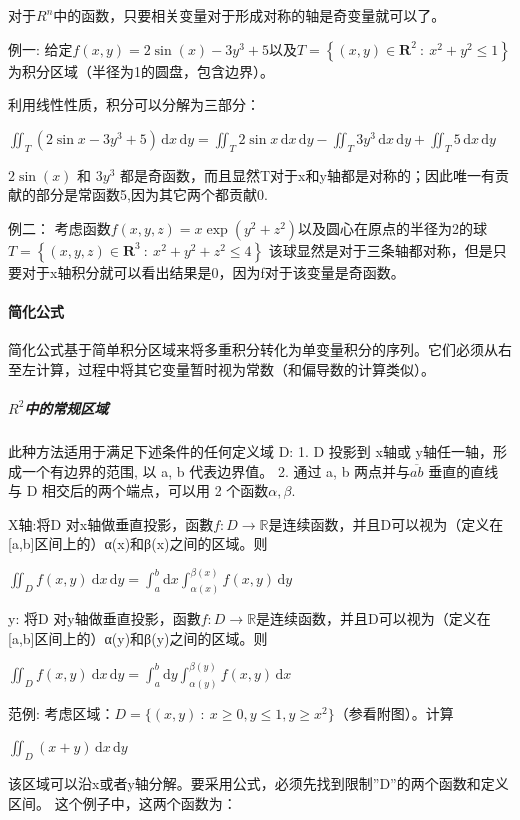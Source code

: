 \documentclass[UTF-8]{ctexart}
\begin{document}
对于$R^n$中的函数，只要相关变量对于形成对称的轴是奇变量就可以了。

例一:
给定$f(x,y) = 2 \sin(x)-3y^3+5$以及$T=\left \{ ( x,y) \in \mathbf{R}^2 \ : \ x^2+y^2\le 1 \right \}$为积分区域（半径为1的圆盘，包含边界）。

利用线性性质，积分可以分解为三部分：

$\iint_T (2\sin x - 3y^3 + 5) \, \mathrm{d}x \, \mathrm{d}y = \iint_T 2 \sin x \, \mathrm{d}x \, \mathrm{d}y - \iint_T 3y^3 \, \mathrm{d}x \, \mathrm{d}y + \iint_T 5 \, \mathrm{d}x \, \mathrm{d}y$

$2\sin(x)$ 和 $3y^3$ 都是奇函数，而且显然T对于x和y轴都是对称的；因此唯一有贡献的部分是常函数5,因为其它两个都贡献0.

例二：
考虑函数$f(x,y,z)=x \exp(y^2+z^2)$以及圆心在原点的半径为2的球
$T = \left \{ ( x,y, z) \in \mathbf{R}^3 \ : \ x^2+y^2+z^2 \le 4 \right \}$
该球显然是对于三条轴都对称，但是只要对于x轴积分就可以看出结果是0，因为f对于该变量是奇函数。

\paragraph{简化公式}
简化公式基于简单积分区域来将多重积分转化为单变量积分的序列。它们必须从右至左计算，过程中将其它变量暂时视为常数（和偏导数的计算类似）。

\subparagraph{$R^2$中的常规区域}
此种方法适用于满足下述条件的任何定义域 D:
1. D 投影到 x轴或 y轴任一轴，形成一个有边界的范围, 以 a, b 代表边界值。
2. 通过 a, b 两点并与$\overline {ab}$ 垂直的直线与 D 相交后的两个端点，可以用 2 个函数$\alpha , \beta $.

X轴:将D 对x轴做垂直投影，函數$f: D \longrightarrow \mathbb{R}$是连续函数，并且D可以视为（定义在[a,b]区间上的）α(x)和β(x)之间的区域。则

$\iint_D f(x,y)\ \mathrm{d}x\, \mathrm{d}y = \int_a^b \mathrm{d}x \int_{ \alpha (x)}^{ \beta (x)} f(x,y)\, \mathrm{d}y$

y:
将D 对y轴做垂直投影，函數$f: D \longrightarrow \mathbb{R}$是连续函数，并且D可以视为（定义在[a,b]区间上的）α(y)和β(y)之间的区域。则

$\iint_D f(x,y)\ \mathrm{d}x\, \mathrm{d}y = \int_a^b \mathrm{d}y \int_{ \alpha (y)}^{ \beta (y)} f(x,y)\, \mathrm{d}x$

范例:
考虑区域：$D = \{ (x,y) \ : \ x \ge 0, y \le 1, y \ge x^2 \}$（参看附图）。计算

$\iint_D (x+y) \, \mathrm{d}x \, \mathrm{d}y$

该区域可以沿x或者y轴分解。要采用公式，必须先找到限制''D''的两个函数和定义区间。
这个例子中，这两个函数为：
\end{document}
